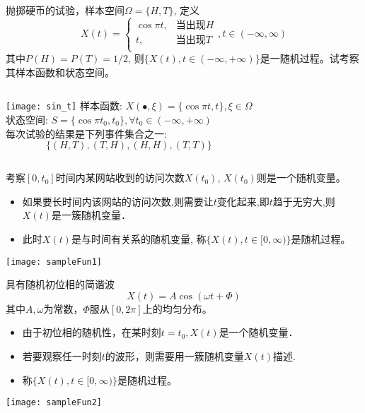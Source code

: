 \begin{frame}
\begin{example}[随机过程示例]
	抛掷硬币的试验，样本空间$\Omega=\{H,T\}$, 定义
	\[X(t)=\begin{cases}
	\cos\pi t, &\text{当出现$H$}\\
	t, &\text{当出现$T$}\\ 
	\end{cases}, t\in(-\infty,\infty)\]
	其中$P(H)=P(T)=1/2$, 则$\{X(t), t\in (-\infty, +\infty)\}$是一随机过程。试考察其样本函数和状态空间。
\end{example}

\medskip
\begin{columns}
	\texttt{[image: sin\_t]}
	样本函数: $X(\bullet,\xi)=\{\cos\pi t, t\}, \xi\in \Omega$\\
	状态空间: $S=\{\cos\pi t_0, t_0\}, \forall t_0\in (-\infty, +\infty)$\\
	每次试验的结果是下列事件集合之一:
	\[ \{(H,T),(T,H),(H,H),(T,T)\} \]
\end{columns}
\end{frame}

\begin{frame}
\begin{example}
	考察$[0,t_0]$时间内某网站收到的访问次数$X(t_0)$, $X(t_0)$则是一个随机变量。
	\begin{itemize}
		\item 如果要长时间内该网站的访问次数,则需要让$t$变化起来,即$t$趋于无穷大,则$X(t)$是一簇随机变量．
		\item 此时$X(t)$是与时间有关系的随机变量, 称$\{X(t),t\in[0,\infty)\}$是随机过程。
	\end{itemize}
\end{example}
\texttt{[image: sampleFun1]}	
\end{frame}

\begin{frame}
\begin{example}
具有随机初位相的简谐波
\[X(t)=A\cos(\omega t+\Phi)\]
其中$A,\omega$为常数，$\Phi$服从$[0,2\pi]$上的均匀分布。
\begin{itemize}
	\item 由于初位相的随机性，在某时刻$t=t_0,X(t)$是一个随机变量．
	\item 若要观察任一时刻$t$的波形，则需要用一簇随机变量$X(t)$描述. 
	\item 称$\{X(t),t\in[0,\infty)\}$是随机过程。
\end{itemize}	
\end{example}
\texttt{[image: sampleFun2]}	
\end{frame}

